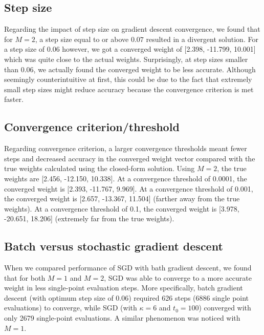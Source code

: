 \documentclass{article}
\begin{document}
\subsection{Step size}
Regarding the impact of step size on gradient descent convergence, we found that for $M =2$, a step size equal to or above $0.07$ resulted in a divergent solution. For a step size of $0.06$ however, we got a converged weight of [2.398, -11.799, 10.001] which was quite close to the actual weights. Surprisingly, at step sizes smaller than $0.06$, we actually found the converged weight to be less accurate. Although seemingly counterintuitive at first, this could be due to the fact that extremely small step sizes might reduce accuracy because the convergence criterion is met faster.

\subsection{Convergence criterion/threshold}
Regarding convergence criterion, a larger convergence thresholds meant fewer steps and decreased accuracy in the converged weight vector compared with the true weights calculated using the closed-form solution. Using $M = 2$, the true weights are [2.456, -12.150, 10.338]. At a convergence threshold of 0.0001, the converged weight is [2.393, -11.767, 9.969]. At a convergence threshold of 0.001, the converged weight is [2.657, -13.367, 11.504] (farther away from the true weights). At a convergence threshold of 0.1, the converged weight is [3.978, -20.651, 18.206] (extremely far from the true weights).

\subsection{Batch versus stochastic gradient descent}
When we compared performance of SGD with bath gradient descent, we found that for both $M = 1$ and $M = 2$, SGD was able to converge to a more accurate weight in less single-point evaluation steps. More specifically, batch gradient descent (with optimum step size of 0.06) required 626 steps (6886 single point evaluations) to converge, while SGD (with $\kappa = 6$ and $t_{0} = 100$) converged with only 2679 single-point evaluations. A similar phenomenon was noticed with $M = 1$.
\end{document}
